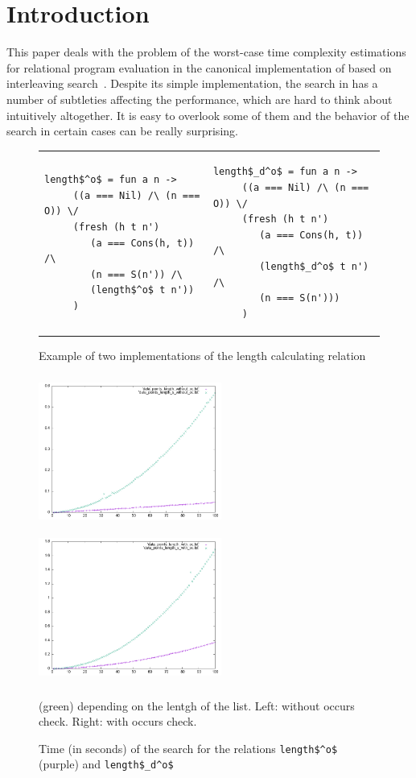 \section{Introduction}
\label{sec:intro}

This paper deals with the problem of the worst-case time complexity estimations for relational program evaluation in the canonical implementation of \mK based on interleaving search~\cite{TRS}. Despite its simple implementation, the search in \mK has a number of subtleties
affecting the performance, which are hard to think about intuitively altogether. It is easy to overlook some of them and the behavior of the search in certain cases can be really surprising.

\begin{figure}[t]
\begin{tabular}{p{5cm}p{5cm}}
\begin{lstlisting}[basicstyle=\small]
   length$^o$ = fun a n ->
     ((a === Nil) /\ (n === O)) \/
     (fresh (h t n')
        (a === Cons(h, t)) /\
        (n === S(n')) /\
        (length$^o$ t n'))
     )
\end{lstlisting} &
\begin{lstlisting}[basicstyle=\small]
   length$_d^o$ = fun a n ->
     ((a === Nil) /\ (n === O)) \/
     (fresh (h t n')
        (a === Cons(h, t)) /\
        (length$_d^o$ t n') /\
        (n === S(n')))
     )
\end{lstlisting}
\end{tabular}
\caption{Example of two implementations of the length calculating relation}
\label{fig:length_implementations}
\end{figure}

\begin{figure}[t]
    \includegraphics[width=6cm,height=5cm]{lengths_without_oc.png}
    \includegraphics[width=6cm,height=5cm]{lengths_with_oc.png}
  \caption{Time (in seconds) of the search for the relations \lstinline|length$^o$| (purple) and \lstinline|length$_d^o$|} (green) depending on the lentgh of the list.
  Left: without occurs check.
  Right: with occurs check.
  \label{fig:length_plots}
\end{figure}

